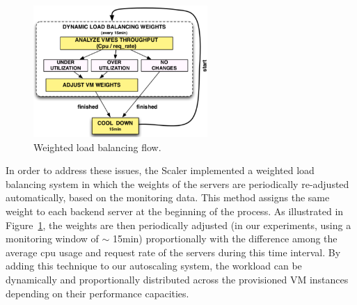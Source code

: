 \begin{figure}[htb]
  \begin{center}
    \includegraphics[height=5cm]{images/load_balancing}
  \end{center}
\vspace{-5mm}
  \caption{Weighted load balancing flow.}
  \label{fig:load_balancing}
\end{figure}


In order to address these issues, the Scaler implemented a weighted 
load balancing system in which the weights of the servers are 
periodically re-adjusted automatically, based on the monitoring data.  
This method assigns the same weight to each backend server at the 
beginning of the process. As illustrated in Figure~\ref{fig:load_balancing}, the weights are then periodically
adjusted (in our experiments, using a monitoring window of $\sim$ 15min) proportionally 
with the difference among the average cpu usage and request rate of the servers 
during this time interval. By adding this technique to our autoscaling system, 
the workload can be dynamically and proportionally distributed across the provisioned VM instances depending on their performance capacities.




